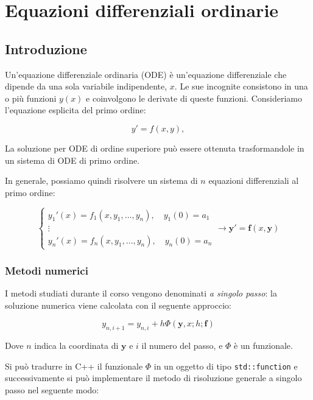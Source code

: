 \setchapterpreamble[u]{\margintoc}
\chapter{Equazioni differenziali ordinarie}

\section{Introduzione}

Un'equazione differenziale ordinaria (ODE) è un'equazione differenziale che
dipende da una sola variabile indipendente, \(x\). Le sue incognite consistono
in una o più funzioni \(y(x)\) e coinvolgono le derivate di queste funzioni.
Consideriamo l'equazione esplicita del primo ordine:

\[
	y' = f(x, y),
\]

La soluzione per ODE di ordine superiore può essere ottenuta trasformandole in
un sistema di ODE di primo ordine.

In generale, possiamo quindi risolvere un sistema di $n$ equazioni differenziali
al primo ordine:

\[
	\begin{cases}
		y_1'(x) = f_1(x, y_1, \dots, y_n), \quad y_1(0) = a_1 \\
		\vdots                                                \\
		y_n'(x) = f_n(x, y_1, \dots, y_n), \quad y_n(0) = a_n
	\end{cases}
	\rightarrow \mathbf{y}' = \mathbf{f}(x, \mathbf{y})
\]

\subsection{Metodi numerici}

I metodi studiati durante il corso vengono denominati \textit{a singolo passo}:
la soluzione numerica viene calcolata con il seguente approccio:

$$
	y_{n, i+1} = y_{n, i} + h \Phi(\mathbf{y}, x; h; \mathbf{f})
$$

Dove $n$ indica la coordinata di $\mathbf{y}$ e $i$ il numero del passo, e $\Phi$
è un funzionale.

Si può tradurre in C++ il funzionale $\Phi$ in un oggetto di tipo
\texttt{std::function} e successivamente si può implementare il metodo di
risoluzione generale a singolo passo nel seguente modo:

